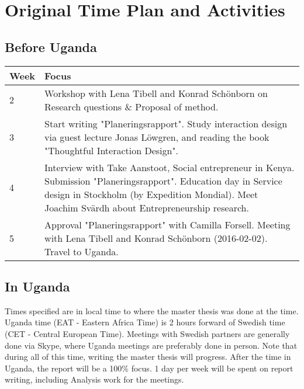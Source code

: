 \section{Original Time Plan and Activities}

\subsection{Before Uganda}

\begin{center}
    \begin{tabular}{ | l | p{10cm} |}
    \hline
    Week & Focus \\ \hline
    2 & Workshop with Lena Tibell and Konrad Schönborn on Research questions \& Proposal of method. \\ \hline
    3 & Start writing "Planeringsrapport".
    Study interaction design
    via guest lecture Jonas Löwgren,
    and reading the book "Thoughtful Interaction Design". \\ \hline
    4 & Interview with Take Aanstoot, Social entrepreneur in Kenya. Submission "Planeringsrapport". Education day in Service design in Stockholm (by Expedition Mondial). Meet Joachim Svärdh about Entrepreneurship research. \\ \hline
    5 & Approval "Planeringsrapport" with Camilla Forsell. Meeting with Lena Tibell and Konrad Schönborn (2016-02-02). Travel to Uganda. \\ \hline

    \end{tabular}
\end{center}

\subsection{In Uganda}

Times specified are in local time to where the master thesis was done at the time. Uganda time (EAT - Eastern Africa Time) is 2 hours forward of Swedish time (CET - Central European Time). Meetings with Swedish partners are generally done via Skype, where Uganda meetings are preferably done in person. Note that during all of this time, writing the master thesis will progress. After the time in Uganda, the report will be a 100\% focus. 1 day per week will be spent on report writing, including Analysis work for the meetings.

